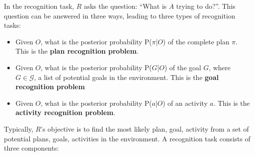 \noindent In the recognition task, $R$ asks the question: ``What is $A$ trying to do?''. This question can be answered in three ways, leading to three types of recognition tasks:
\begin{itemize}
\item Given $O$, what is the posterior probability P($\pi$|$O$) of the complete plan $\pi$. This is the \textbf{plan recognition problem}.
\item Given $O$, what is the posterior probability P($G$|$O$) of the goal $G$, where $G \in \mathcal{G}$, a list of potential goals in the environment. This is the \textbf{goal recognition problem}
\item Given $O$, what is the posterior probability P($a$|$O$) of an activity $a$. This is the \textbf{activity recognition problem}.
\end{itemize}
\noindent Typically, $R$'s objective is to find the most likely plan, goal, activity from a set of potential plans, goals, activities in the environment. A recognition task consists of three components:
